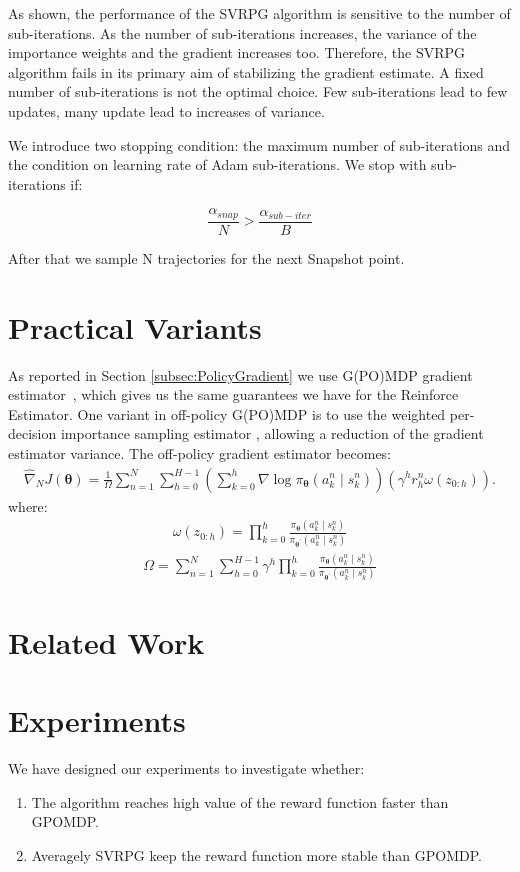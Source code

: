 \documentclass{article}
\theoremstyle{remark}
\theoremstyle{definition}
\newcommand{\vtheta}{\boldsymbol{\theta}}
\newcommand{\score}[2]{\nabla\log\pi_{#1}(#2)}
\newcommand{\gradApp}[2]{\hat{\nabla}_{#2}J(#1)}
\begin{document}
As shown, the performance of the SVRPG algorithm is sensitive to the number of sub-iterations.
As the number of sub-iterations increases, the variance of the importance weights and the gradient increases too.
Therefore, the SVRPG algorithm fails in its primary aim of stabilizing the gradient estimate.
A fixed number of sub-iterations is not the optimal choice.
Few sub-iterations lead to few updates, many update lead to increases of variance.

We introduce two stopping condition: the maximum number of sub-iterations and the condition on learning rate of Adam sub-iterations.
We stop with sub-iterations if:

\[\frac{\alpha_{snap}}{N}>\frac{\alpha_{sub-iter}}{B}\]

After that we sample N trajectories for the next Snapshot point.


\section{Practical Variants}

As reported in Section \ref{subsec:PolicyGradient} we use G(PO)MDP gradient estimator~\cite{baxter2001infinite}, which gives us the same guarantees we have for the Reinforce Estimator.
One variant in off-policy G(PO)MDP is to use the weighted per-decision importance sampling estimator \cite{precup2000eligibility}, allowing a reduction of the gradient estimator variance. The off-policy gradient estimator becomes:
\begin{align*}
\gradApp{\vtheta}{N} = \frac{1}{\Omega}\sum_{n=1}^{N}\sum_{h=0}^{H-1}\left(\sum_{k=0}^{h}\score{\vtheta}{a_k^n\mid s_k^n}\right)\left(\gamma^h r_h^n \omega(z_{0:h})\right).
\end{align*} 
where:
\begin{align*}
\omega(z_{0:h}) = \prod_{k=0}^{h} \frac{\pi_{\vtheta}({a_k^n\mid s_k^n})
 }{\pi_{\vtheta^{'}}({a_k^n\mid s_k^n})}
\end{align*}
\begin{align*}
\Omega = \sum_{n=1}^{N}\sum_{h=0}^{H-1}\gamma^h\prod_{k=0}^{h} \frac{\pi_{\vtheta}({a_k^n\mid s_k^n})
}{\pi_{\vtheta^{'}}({a_k^n\mid s_k^n})}
\end{align*}

\section{Related Work}

\section{Experiments}\label{sec:exp}
We have designed our experiments to investigate whether:
\begin{enumerate}
\item The algorithm reaches high value of the reward function faster than GPOMDP.
\item Averagely SVRPG keep the reward function more stable than GPOMDP.
\end{enumerate}
\end{document}
